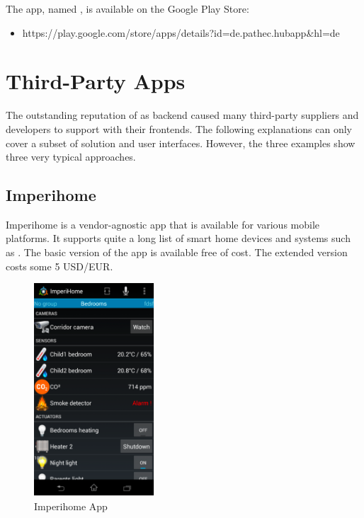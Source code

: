 The app, named , is available on the Google Play Store:

\begin{itemize}
\item https://play.google.com/store/apps/details?id=de.pathec.hubapp\&hl=de
\end{itemize}

\section{Third-Party Apps}

The outstanding reputation of \zway as \zwave backend caused many third-party suppliers 
and developers to support \zway with their frontends. The following explanations can only 
cover a subset of solution and user interfaces. However, the three examples show three 
very typical approaches.

\subsection{Imperihome}

Imperihome is a vendor-agnostic app that is available for various mobile platforms. It 
supports quite a long list of smart home devices and systems such as \zway. The basic 
version of the app is available free of cost. The extended version costs some 5 USD/EUR.

\begin{figure}
\begin{center}
\includegraphics[width=0.4\textwidth]{pngs/cap5/mobile4.png}
\caption{Imperihome App}
\label{mobile4}
\end{center}
\end{figure}

